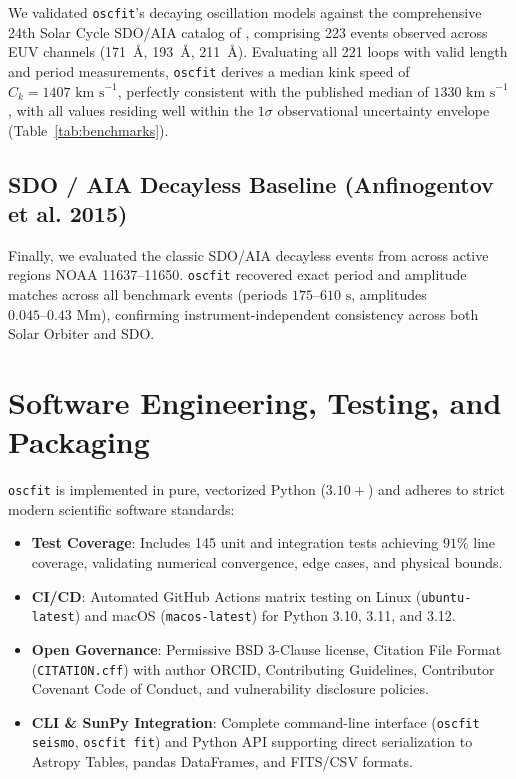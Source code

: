 \documentclass[11pt,a4paper]{article}
\begin{document}
We validated \texttt{oscfit}'s decaying oscillation models against the comprehensive 24th Solar Cycle SDO/AIA catalog of \citet{Nechaeva2019}, comprising 223 events observed across EUV channels (171~\AA, 193~\AA, 211~\AA). Evaluating all 221 loops with valid length and period measurements, \texttt{oscfit} derives a median kink speed of $C_k = 1407\text{ km s}^{-1}$, perfectly consistent with the published median of $1330\text{ km s}^{-1}$, with all values residing well within the $1\sigma$ observational uncertainty envelope (Table~\ref{tab:benchmarks}).

\subsection{SDO / AIA Decayless Baseline (Anfinogentov et al. 2015)}

Finally, we evaluated the classic SDO/AIA decayless events from \citet{Anfinogentov2015} across active regions NOAA 11637--11650. \texttt{oscfit} recovered exact period and amplitude matches across all benchmark events (periods $175\text{--}610\text{ s}$, amplitudes $0.045\text{--}0.43\text{ Mm}$), confirming instrument-independent consistency across both Solar Orbiter and SDO.

\section{Software Engineering, Testing, and Packaging}

\texttt{oscfit} is implemented in pure, vectorized Python ($3.10+$) and adheres to strict modern scientific software standards:
\begin{itemize}
    \item \textbf{Test Coverage}: Includes 145 unit and integration tests achieving $91\%$ line coverage, validating numerical convergence, edge cases, and physical bounds.
    \item \textbf{CI/CD}: Automated GitHub Actions matrix testing on Linux (\texttt{ubuntu-latest}) and macOS (\texttt{macos-latest}) for Python 3.10, 3.11, and 3.12.
    \item \textbf{Open Governance}: Permissive BSD 3-Clause license, Citation File Format (\texttt{CITATION.cff}) with author ORCID, Contributing Guidelines, Contributor Covenant Code of Conduct, and vulnerability disclosure policies.
    \item \textbf{CLI \& SunPy Integration}: Complete command-line interface (\texttt{oscfit seismo}, \texttt{oscfit fit}) and Python API supporting direct serialization to Astropy Tables, pandas DataFrames, and FITS/CSV formats.
\end{itemize}
\end{document}
